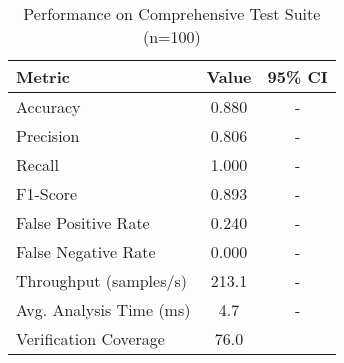 \begin{table}[h]
\centering
\caption{Performance on Comprehensive Test Suite (n=100)}
\begin{tabular}{lcc}
\toprule
\textbf{Metric} & \textbf{Value} & \textbf{95\% CI} \\
\midrule
Accuracy & 0.880 & - \\
Precision & 0.806 & - \\
Recall & 1.000 & - \\
F1-Score & 0.893 & - \\
False Positive Rate & 0.240 & - \\
False Negative Rate & 0.000 & - \\
\midrule
Throughput (samples/s) & 213.1 & - \\
Avg. Analysis Time (ms) & 4.7 & - \\
Verification Coverage & 76.0%
\bottomrule
\end{tabular}
\label{tab:table1}
\end{table}
